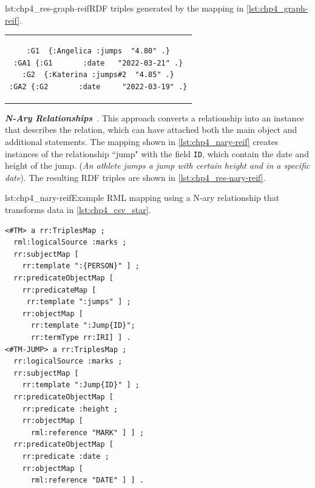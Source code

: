 \noindent\hspace{0.12\linewidth}\begin{minipage}{\linewidth}
\begin{captionedlisting}{lst:chp4_res-graph-reif}{RDF triples generated by the mapping in \cref{lst:chp4_graph-reif}.}
\centering
\begin{tabular}{c}
\hspace{4em}
{\begin{lstlisting}[basicstyle=\ttfamily\small,label={list:example1},columns=flexible]
:G1  {:Angelica :jumps  "4.80" .}
:GA1 {:G1       :date   "2022-03-21" .}
:G2  {:Katerina :jumps#2  "4.85" .}
:GA2 {:G2       :date     "2022-03-19" .}
\end{lstlisting}}
\end{tabular}
\end{captionedlisting}
\end{minipage}


\textit{\textbf{N-Ary Relationships}}~\citep{naryw3c2006}. This approach  converts a relationship into an instance that describes the relation, which can have attached both the main object and additional statements. The mapping shown in \cref{lst:chp4_nary-reif} creates instances of the relationship ``jump" with the field \texttt{ID}, which contain the date and height of the jump.  (\textit{An athlete jumps a jump with certain height and in a specific date}). 
The resulting RDF triples are shown in \cref{lst:chp4_res-nary-reif}.

\begin{minipage}{\linewidth}
\begin{captionedlisting}{lst:chp4_nary-reif}{Example RML mapping using a N-ary relationship that transforms data in \cref{lst:chp4_csv_star}.}
\centering
\begin{multicols}{2}
{\begin{lstlisting}[basicstyle=\ttfamily\small,label={list:example1},columns=flexible]
<#TM> a rr:TriplesMap ;
  rml:logicalSource :marks ;
  rr:subjectMap [ 
    rr:template ":{PERSON}" ] ;
  rr:predicateObjectMap [ 
    rr:predicateMap [
     rr:template ":jumps" ] ;
    rr:objectMap [
      rr:template ":Jump{ID}";
      rr:termType rr:IRI] ] .
<#TM-JUMP> a rr:TriplesMap ;
  rr:logicalSource :marks ;
  rr:subjectMap [ 
    rr:template ":Jump{ID}" ] ;
  rr:predicateObjectMap [ 
    rr:predicate :height ;
    rr:objectMap [
      rml:reference "MARK" ] ] ;
  rr:predicateObjectMap [ 
    rr:predicate :date ;
    rr:objectMap [
      rml:reference "DATE" ] ] .
\end{lstlisting}}
\end{multicols}
\end{captionedlisting}
\end{minipage}

